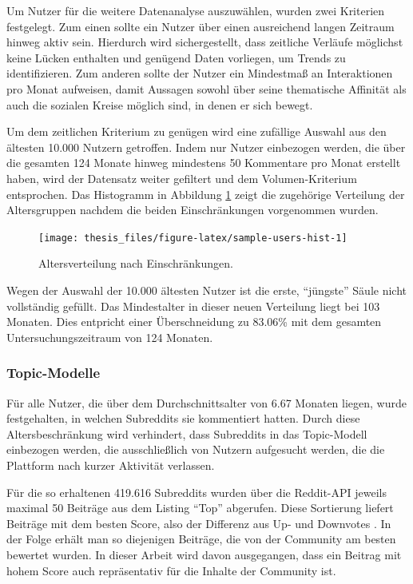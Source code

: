 \documentclass[11pt,a4paper,twoside]{article}
\begin{document}
Um Nutzer für die weitere Datenanalyse auszuwählen, wurden zwei
Kriterien festgelegt. Zum einen sollte ein Nutzer über einen ausreichend
langen Zeitraum hinweg aktiv sein. Hierdurch wird sichergestellt, dass
zeitliche Verläufe möglichst keine Lücken enthalten und genügend Daten
vorliegen, um Trends zu identifizieren. Zum anderen sollte der Nutzer
ein Mindestmaß an Interaktionen pro Monat aufweisen, damit Aussagen
sowohl über seine thematische Affinität als auch die sozialen Kreise
möglich sind, in denen er sich bewegt.

Um dem zeitlichen Kriterium zu genügen wird eine zufällige Auswahl aus
den ältesten 10.000 Nutzern getroffen. Indem nur Nutzer einbezogen
werden, die über die gesamten 124 Monate hinweg mindestens 50 Kommentare
pro Monat erstellt haben, wird der Datensatz weiter gefiltert und dem
Volumen-Kriterium entsprochen. Das Histogramm in Abbildung
\ref{fig:sample-users-hist} zeigt die zugehörige Verteilung der
Altersgruppen nachdem die beiden Einschränkungen vorgenommen wurden.

\begin{figure}

{\centering \texttt{[image: thesis\_files/figure-latex/sample-users-hist-1]} 

}

\caption{Altersverteilung nach Einschränkungen.}\label{fig:sample-users-hist}
\end{figure}

Wegen der Auswahl der 10.000 ältesten Nutzer ist die erste,
\enquote{jüngste} Säule nicht vollständig gefüllt. Das Mindestalter in
dieser neuen Verteilung liegt bei 103 Monaten. Dies entpricht einer
Überschneidung zu 83.06\% mit dem gesamten Untersuchungszeitraum von 124
Monaten.

\hypertarget{topic-modelle-1}{%
\subsubsection{Topic-Modelle}\label{topic-modelle-1}}

Für alle Nutzer, die über dem Durchschnittsalter von 6.67 Monaten
liegen, wurde festgehalten, in welchen Subreddits sie kommentiert
hatten. Durch diese Altersbeschränkung wird verhindert, dass Subreddits
in das Topic-Modell einbezogen werden, die ausschließlich von Nutzern
aufgesucht werden, die die Plattform nach kurzer Aktivität verlassen.

Für die so erhaltenen 419.616 Subreddits wurden über die Reddit-API
jeweils maximal 50 Beiträge aus dem Listing \enquote{Top} abgerufen.
Diese Sortierung liefert Beiträge mit dem besten Score, also der
Differenz aus Up- und Downvotes \autocite{RedditSrc}. In der Folge
erhält man so diejenigen Beiträge, die von der Community am besten
bewertet wurden. In dieser Arbeit wird davon ausgegangen, dass ein
Beitrag mit hohem Score auch repräsentativ für die Inhalte der Community
ist.
\end{document}
